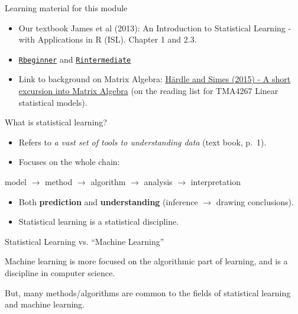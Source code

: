 \documentclass[10pt,ignorenonframetext,]{beamer}
\begin{document}
\begin{frame}

\begin{block}{Learning material for this module}

\begin{itemize}
\item
  Our textbook James et al (2013): An Introduction to Statistical
  Learning - with Applications in R (ISL). Chapter 1 and 2.3.
\item
  \href{https://www.math.ntnu.no/emner/TMA4268/2019v/1Intro/Rbeginner.html}{\texttt{Rbeginner}}
  and
  \href{https://www.math.ntnu.no/emner/TMA4268/2019v/1Intro/Rintermediate.html}{\texttt{Rintermediate}}
\item
  Link to background on Matrix Algebra:
  \href{https://link.springer.com/chapter/10.1007/978-3-662-45171-7_2}{Härdle
  and Simes (2015) - A short excursion into Matrix Algebra} (on the
  reading list for TMA4267 Linear statistical models).
\end{itemize}

\end{block}

\end{frame}

\begin{frame}{What is statistical learning?}

\begin{itemize}
\item
  Refers to \emph{a vast set of tools to understanding data} (text book,
  p.~1).
\item
  Focuses on the whole chain:
\end{itemize}

model \(\rightarrow\) method \(\rightarrow\) algorithm \(\rightarrow\)
analysis \(\rightarrow\) interpretation

\begin{itemize}
\item
  Both \textbf{prediction} and \textbf{understanding} (inference
  \(\rightarrow\) drawing conclusions).
\item
  Statistical learning is a statistical discipline.
\end{itemize}

\end{frame}

\begin{frame}{Statistical Learning vs. ``Machine Learning''}

Machine learning is more focused on the algorithmic part of learning,
and is a discipline in computer science.

But, many methods/algorithms are common to the fields of statistical
learning and machine learning.

\end{frame}
\end{document}
